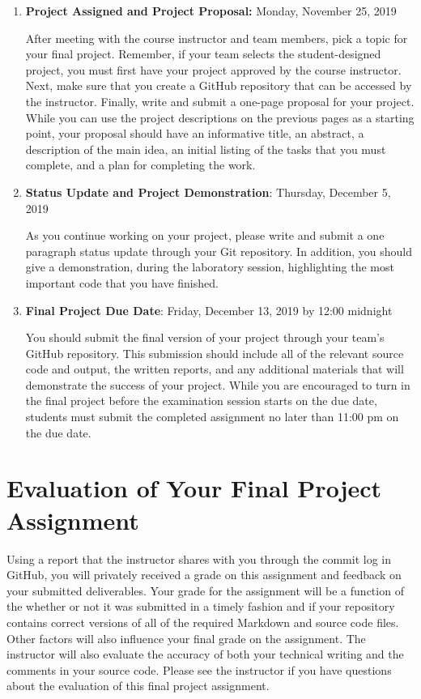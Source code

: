 \documentclass[11pt]{article}
\begin{document}
\begin{enumerate}

  \item {\bf Project Assigned and Project Proposal:} Monday, November 25, 2019

    After meeting with the course instructor and team members, pick a topic for
    your final project. Remember, if your team selects the student-designed
    project, you must first have your project approved by the course instructor.
    Next, make sure that you create a GitHub repository that can be accessed by
    the instructor. Finally, write and submit a one-page proposal for your
    project. While you can use the project descriptions on the previous pages as
    a starting point, your proposal should have an informative title, an
    abstract, a description of the main idea, an initial listing of the tasks
    that you must complete, and a plan for completing the work.

  \item {\bf Status Update and Project Demonstration}: Thursday, December 5, 2019

    As you continue working on your project, please write and submit a one
    paragraph status update through your Git repository. In addition, you should
    give a demonstration, during the laboratory session, highlighting the most
    important code that you have finished.

  \item {\bf Final Project Due Date}: Friday, December 13, 2019 by 12:00 midnight

    You should submit the final version of your project through your team's
    GitHub repository. This submission should include all of the relevant source
    code and output, the written reports, and any additional materials that will
    demonstrate the success of your project. While you are encouraged to turn in
    the final project before the examination session starts on the due date,
    students must submit the completed assignment no later than 11:00 pm on the
    due date.

\end{enumerate}

\section*{Evaluation of Your Final Project Assignment}

Using a report that the instructor shares with you through the commit log in
GitHub, you will privately received a grade on this assignment and feedback on
your submitted deliverables. Your grade for the assignment will be a function of
the whether or not it was submitted in a timely fashion and if your repository
contains correct versions of all of the required Markdown and source code files.
Other factors will also influence your final grade on the assignment. The
instructor will also evaluate the accuracy of both your technical writing and
the comments in your source code. Please see the instructor if you have
questions about the evaluation of this final project assignment.
\end{document}
